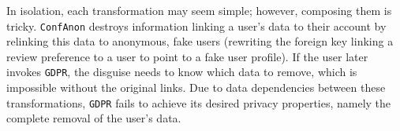%
In isolation, each transformation may seem simple; however, composing them is tricky.
\texttt{ConfAnon} destroys information linking a user's data to their account by relinking this data
to anonymous, fake users (\eg rewriting the foreign key linking a review preference to a user to
point to a fake user profile).  If the user later invokes \texttt{GDPR}, the
disguise needs to know which data to remove, which is impossible without the original links.
%
Due to data dependencies between these transformations, \texttt{GDPR} fails to achieve its desired
privacy properties, namely the complete removal of the user's data.
%
